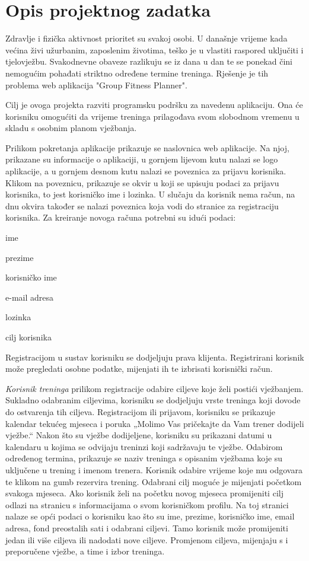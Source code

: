 \chapter{Opis projektnog zadatka}
		
		{Zdravlje i fizička aktivnost prioritet su svakoj osobi. U današnje vrijeme kada većina živi užurbanim, zaposlenim životima, teško je u vlastiti raspored uključiti i  tjelovježbu. Svakodnevne obaveze razlikuju se iz dana u dan te se ponekad čini nemogućim pohađati striktno određene termine treninga. Rješenje je tih problema web aplikacija "Group Fitness Planner".}
		
		{Cilj je ovoga projekta razviti programsku podršku za navedenu aplikaciju. Ona će korisniku omogućiti da vrijeme treninga prilagođava svom slobodnom vremenu u skladu s osobnim planom vježbanja.}
		
		{Prilikom pokretanja aplikacije prikazuje se naslovnica web aplikacije. Na njoj, prikazane su informacije o aplikaciji, u gornjem lijevom kutu nalazi se logo aplikacije, a u gornjem desnom kutu nalazi se poveznica za prijavu korisnika. Klikom na poveznicu, prikazuje se okvir u koji se upisuju podaci za prijavu korisnika, to jest korisničko ime i lozinka. U slučaju da korisnik nema račun, na dnu okvira također se nalazi poveznica koja vodi do stranice za registraciju korisnika. Za kreiranje novoga računa potrebni su idući podaci:}
		\begin{packed_item}
			\item {ime}
			\item {prezime}
			\item {korisničko ime}
			\item {e-mail adresa}
			\item {lozinka}
			\item {cilj korisnika}
		\end{packed_item}
		
		{Registracijom u sustav korisniku se dodjeljuju prava klijenta. Registrirani korisnik može pregledati osobne podatke, mijenjati ih te izbrisati korisnički račun.}
		
		{\textit{Korisnik treninga} prilikom registracije odabire ciljeve koje želi postići vježbanjem. Sukladno odabranim ciljevima, korisniku se dodjeljuju vrste treninga koji dovode do ostvarenja tih ciljeva. Registracijom ili prijavom,  korisniku se prikazuje kalendar tekućeg mjeseca i poruka „Molimo Vas pričekajte da Vam trener dodijeli vježbe.“ Nakon što su vježbe dodijeljene, korisniku su prikazani datumi u kalendaru u kojima se odvijaju treninzi koji sadržavaju te vježbe. Odabirom određenog termina, prikazuje se naziv treninga s opisanim vježbama koje su uključene u trening i imenom trenera. Korisnik odabire vrijeme koje mu odgovara te klikom na gumb rezervira trening. Odabrani cilj moguće je mijenjati početkom svakoga mjeseca. Ako korisnik želi na početku novog mjeseca promijeniti cilj odlazi na stranicu s informacijama o svom korisničkom profilu. Na toj stranici nalaze se opći podaci o korisniku kao što su ime, prezime, korisničko ime, email adresa, fond preostalih sati i odabrani ciljevi. Tamo korisnik može promijeniti jedan ili više ciljeva ili nadodati nove ciljeve. Promjenom ciljeva, mijenjaju s i preporučene vježbe, a time i izbor treninga.}
		
